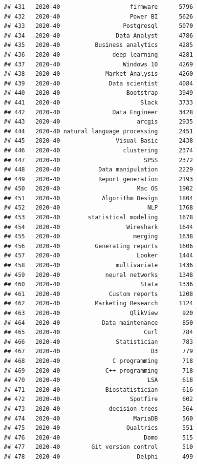 \documentclass[
]{article}
\begin{document}
\begin{verbatim}
## 431   2020-40                    firmware      5796
## 432   2020-40                    Power BI      5626
## 433   2020-40                  Postgresql      5070
## 434   2020-40                Data Analyst      4786
## 435   2020-40          Business analytics      4285
## 436   2020-40               deep learning      4281
## 437   2020-40                  Windows 10      4269
## 438   2020-40             Market Analysis      4260
## 439   2020-40              Data scientist      4084
## 440   2020-40                   Bootstrap      3949
## 441   2020-40                       Slack      3733
## 442   2020-40               Data Engineer      3428
## 443   2020-40                      arcgis      2935
## 444   2020-40 natural language processing      2451
## 445   2020-40                Visual Basic      2438
## 446   2020-40                  clustering      2374
## 447   2020-40                        SPSS      2372
## 448   2020-40           Data manipulation      2229
## 449   2020-40           Report generation      2193
## 450   2020-40                      Mac OS      1902
## 451   2020-40            Algorithm Design      1804
## 452   2020-40                         NLP      1768
## 453   2020-40        statistical modeling      1678
## 454   2020-40                   Wireshark      1644
## 455   2020-40                     merging      1638
## 456   2020-40          Generating reports      1606
## 457   2020-40                      Looker      1444
## 458   2020-40                multivariate      1436
## 459   2020-40             neural networks      1348
## 460   2020-40                       Stata      1336
## 461   2020-40              Custom reports      1208
## 462   2020-40          Marketing Research      1124
## 463   2020-40                    QlikView       920
## 464   2020-40            Data maintenance       850
## 465   2020-40                        Curl       784
## 466   2020-40                Statistician       783
## 467   2020-40                          D3       779
## 468   2020-40               C programming       718
## 469   2020-40             C++ programming       718
## 470   2020-40                         LSA       618
## 471   2020-40             Biostatistician       616
## 472   2020-40                    Spotfire       602
## 473   2020-40              decision trees       564
## 474   2020-40                     MariaDB       560
## 475   2020-40                   Qualtrics       551
## 476   2020-40                        Domo       515
## 477   2020-40         Git version control       510
## 478   2020-40                      Delphi       499

\end{verbatim}
\end{document}
